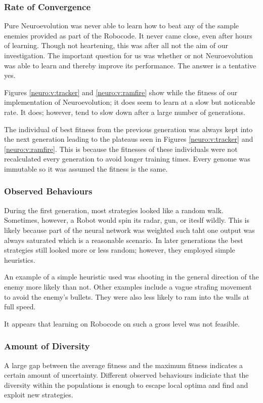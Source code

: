 \subsubsection{Rate of Convergence}
Pure Neuroevolution was never able to learn how to beat any of the sample enemies provided as part of the Robocode. It never came close, even after hours of learning. Though not heartening, this was after all not the aim of our investigation. The important question for us was whether or not Neuroevolution was able to learn and thereby improve its performance. The answer is a tentative yes.

Figures \ref{neuro:v:tracker} and \ref{neuro:v:ramfire} show while the fitness of our implementation of Neuroevolution; it does seem to learn at a slow but noticeable rate. It does; however, tend to slow down after a large number of generations. 

The individual of best fitness from the previous generation was always kept into the next generation leading to the plateaus seen in Figures \ref{neuro:v:tracker} and \ref{neuro:v:ramfire}. This is because the fitnesses of these individuals were not recalculated every generation to avoid longer training times. Every genome was immutable so it was assumed the fitness is the same.

\subsubsection{Observed Behaviours}
During the first generation, most strategies looked like a random walk. Sometimes, however, a Robot would spin its radar, gun, or iteslf wildly. This is likely because part of the neural network was weighted such taht one output was always saturated which is a reasonable scenario. In later generations the best strategies still looked more or less random; however, they employed simple heuristics.

An example of a simple heuristic used was shooting in the general direction of the enemy more likely than not. Other examples include a vague strafing movement to avoid the enemy's bullets. They were also less likely to ram into the walls at full speed.

It appears that learning on Robocode on such a gross level was not feasible. 


\FigNeurovTracker
\FigNeurovRamFire


\subsubsection{Amount of Diversity}
A large gap between the average fitness and the maximum fitness indicates a certain amount of uncertainty. Different observed behaviours indiciate that the diversity within the populations is enough to escape local optima and find and exploit new strategies.

